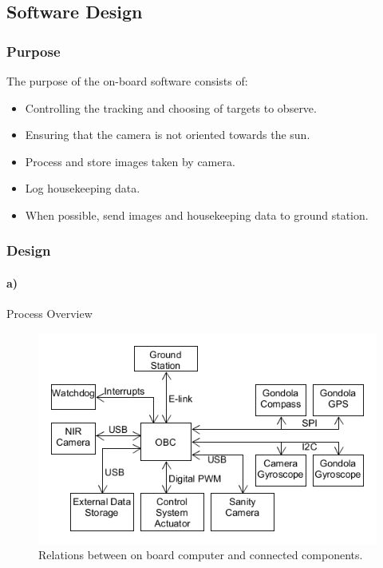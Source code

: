 \pagebreak
\subsection{Software Design}

\subsubsection{Purpose}

The purpose of the on-board software consists of:
\begin{itemize}
	\item Controlling the tracking and choosing of targets to observe.
	\item Ensuring that the camera is not oriented towards the sun.
	\item Process and store images taken by camera.
	\item Log housekeeping data.
	\item When possible, send images and housekeeping data to ground station.
\end{itemize}



\subsubsection{Design}

\paragraph{a)} Process Overview\\

\begin{figure}[H]
	\centering
	\includegraphics[width=\textwidth]{4-experiment-design/img/software/process-overview.png}
	\caption{Relations between on board computer and connected components.}
	\label{fig:software-process-overview}
\end{figure}

